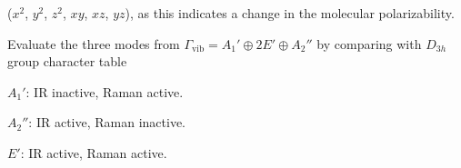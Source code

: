 \begin{solution}
\begin{enumext}
\begin{enumext}
      ($x^2$, $y^2$, $z^2$, $xy$, $xz$, $yz$), as this indicates a change in
      the molecular polarizability.
    \end{enumext}
    Evaluate the three modes
    from $\Gamma_\text{vib} = A_1' \oplus 2E' \oplus A_2''$ by comparing with
    $D_{3h}$ group character table
    \begin{enumext}[columns = 2]
      \item $A_1'$: IR inactive, Raman active.
      \item $A_2''$: IR active, Raman inactive.
      \item $E'$: IR active, Raman active.
    \end{enumext}
  \end{enumext}
\end{solution}

\newpage

